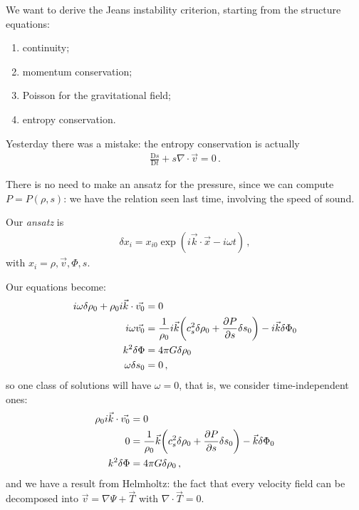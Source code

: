 \documentclass[main.tex]{subfiles}
\begin{document}

We want to derive the Jeans instability criterion, starting from the structure equations: 
%
\begin{enumerate}
    \item continuity;
    \item momentum conservation;
    \item Poisson for the gravitational field;
    \item entropy conservation. 
\end{enumerate}

Yesterday there was a mistake: the entropy conservation is actually 
%
\begin{align}
  \frac{\mathrm{D} s}{\mathrm{D} t} + s \nabla \cdot \vec{v} = 0 
\,.
\end{align}
%

There is no need to make an ansatz for the pressure, since we can compute \(P = P (\rho ,s )\): we have the relation seen last time, involving the speed of sound. 

Our \emph{ansatz } is 
%
\begin{align}
  \delta x_i = x_{i0} \exp( i \vec{k} \cdot \vec{x} - i \omega t)
\,,
\end{align}
%
with \(x_{i} = \rho, \vec{v}, \Phi , s\). 

Our equations become: 
%
\begin{subequations}
\begin{align}
  i \omega \delta \rho_0 + \rho_0 i \vec{k} \cdot \vec{v_0} &=0  \\
  i \omega \vec{v_0} &= \frac{1}{\rho_0 } i \vec{k}
  \qty(c^2_s \delta \rho_0 + \pdv{P}{s} \delta s_0 ) 
  - i \vec{k} \delta \Phi_0 \\
  k^2 \delta \Phi &= 4 \pi G \delta \rho_0  \\
  \omega \delta s_0 &= 0
\,,
\end{align}
\end{subequations}
%
so one class of solutions will have \(\omega = 0\), that is, we consider time-independent ones: 
%
\begin{subequations}
\begin{align}
  \rho_0 i \vec{k} \cdot \vec{v_0} &=0  \\
  0 &= \frac{1}{\rho_0 }  \vec{k}
  \qty(c^2_s \delta \rho_0 + \pdv{P}{s} \delta s_0 ) 
  - \vec{k} \delta \Phi_0 \\
  k^2 \delta \Phi &= 4 \pi G \delta \rho_0  
\,,
\end{align}
\end{subequations}
%
and we have a result from Helmholtz: the fact that every velocity field can be decomposed into \(\vec{v} = \nabla \Psi + \vec{T}\) with \(\nabla \cdot \vec{T} = 0\). 
\end{document}

